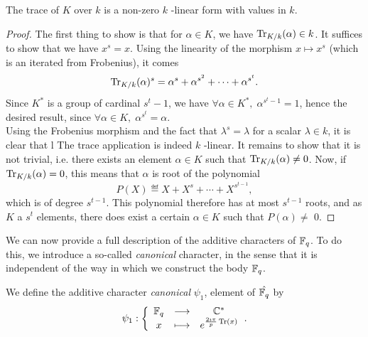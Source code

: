 \begin{prop}
The trace of $ K $ over $ k $ is a non-zero $ k $ -linear form with values in $ k $.
\end{prop}
\begin{proof}
 The first thing to show is that for $ \alpha \in K $, we have $ \operatorname{Tr}_{K / k} (\alpha) \in k $. It suffices to show that we have $ x^s = x $. Using the linearity of the morphism $ x \mapsto x^s $ (which is an iterated from Frobenius), it comes
\begin{equation*}
\operatorname{Tr}_{K / k} (\alpha)^s = \alpha^s + \alpha^{s^2} + \cdots + \alpha^{s^t}.
\end{equation*}
Since $ K^* $ is a group of cardinal $ s^t-1 $, we have $ \forall \alpha \in K^*, \; \alpha^{s^t-1} = 1 $, hence the desired result, since $ \forall \alpha \in K, \; \alpha^{s^t} = \alpha $. \\Using the Frobenius morphism and the fact that $ \lambda^s = \lambda $ for a scalar $ \lambda \in k $, it is clear that l The trace application is indeed $ k $ -linear. It remains to show that it is not trivial, i.e. there exists an element $ \alpha \in K $ such that $ \operatorname{Tr}_{K / k} (\alpha) \neq 0 $. Now, if $ \operatorname{Tr}_{K / k} (\alpha) = 0 $, this means that $ \alpha $ is root of the polynomial
\begin{equation*}
P (X) \eqdef X + X^s + \cdots + X^{s^{t-1}},
\end{equation*}
which is of degree $ s^{t-1} $. This polynomial therefore has at most $ s^{t-1} $ roots, and as $ K $ a $ s^t $ elements, there does exist a certain $ \alpha \in K $ such that $ P (\alpha) \neq $ 0.
\end{proof}
 
We can now provide a full description of the additive characters of $ \mathbb{F}_q $. To do this, we introduce a so-called \textit{canonical} character, in the sense that it is independent of the way in which we construct the body $ \mathbb{F}_q $.
 
\begin{defn}
\label{defn-character-additive-canonical}
 \label{notation-27} We define the additive character \textit{canonical} $ \psi_1 $, element of $ \hat{\mathbb{F}_q} $ by
\begin{equation*}
\psi_1: {\left\{ \begin{array}{ccc} \mathbb{F}_q & \longrightarrow & \mathbb{C}^* \\ x & \longmapsto & e^{\frac{2 \imath \pi}{p} \operatorname{Tr} (x)} \end{array} \right.}.
\end{equation*}
\end{defn}
 
